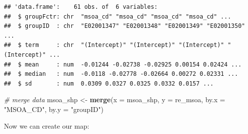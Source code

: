 \documentclass[]{book}
\newenvironment{Shaded}{\begin{snugshade}}{\end{snugshade}}
\newcommand{\KeywordTok}[1]{\textcolor[rgb]{0.13,0.29,0.53}{\textbf{#1}}}
\newcommand{\DataTypeTok}[1]{\textcolor[rgb]{0.13,0.29,0.53}{#1}}
\newcommand{\StringTok}[1]{\textcolor[rgb]{0.31,0.60,0.02}{#1}}
\newcommand{\CommentTok}[1]{\textcolor[rgb]{0.56,0.35,0.01}{\textit{#1}}}
\newcommand{\OperatorTok}[1]{\textcolor[rgb]{0.81,0.36,0.00}{\textbf{#1}}}
\newcommand{\NormalTok}[1]{#1}
\begin{document}
\begin{Shaded}
\end{Shaded}

\begin{verbatim}
## 'data.frame':    61 obs. of  6 variables:
##  $ groupFctr: chr  "msoa_cd" "msoa_cd" "msoa_cd" "msoa_cd" ...
##  $ groupID  : chr  "E02001347" "E02001348" "E02001349" "E02001350" ...
##  $ term     : chr  "(Intercept)" "(Intercept)" "(Intercept)" "(Intercept)" ...
##  $ mean     : num  -0.01244 -0.02738 -0.02925 0.00154 0.02424 ...
##  $ median   : num  -0.0118 -0.02778 -0.02664 0.00272 0.02331 ...
##  $ sd       : num  0.0309 0.0327 0.0325 0.0332 0.0157 ...
\end{verbatim}

\begin{Shaded}
\begin{Highlighting}[]
\CommentTok{# merge data}
\NormalTok{msoa_shp <-}\StringTok{ }\KeywordTok{merge}\NormalTok{(}\DataTypeTok{x =}\NormalTok{ msoa_shp, }\DataTypeTok{y =}\NormalTok{ re_msoa, }\DataTypeTok{by.x =} \StringTok{"MSOA_CD"}\NormalTok{, }\DataTypeTok{by.y =} \StringTok{"groupID"}\NormalTok{)}
\end{Highlighting}
\end{Shaded}

Now we can create our map:
\end{document}
